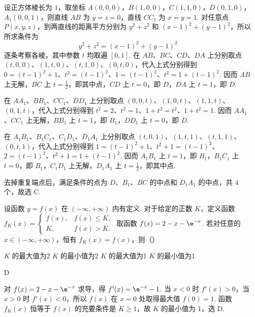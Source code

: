\begin{solution}
设正方体棱长为 \(1\)，取坐标 \(A(0,0,0)\)，\(B(1,0,0)\)，\(C(1,1,0)\)，\(D(0,1,0)\)，\(A_{1}(0,0,1)\)，则直线 \(AB\) 为 \(y=z=0\)，直线 \(CC_{1}\) 为 \(x=y=1\). 对任意点 \(P(x,y,z)\)，到两直线的距离平方分别为 \(y^{2}+z^{2}\) 和 \((x-1)^{2}+(y-1)^{2}\)，所以所求条件为
\[
y^2+z^2=(x-1)^2+(y-1)^2
\]
逐条考察各棱，其中参数 \(t\) 均取遍 \([0,1]\). 在 \(AB\)、\(BC\)、\(CD\)、\(DA\) 上分别取点 \((t,0,0)\)、\((1,t,0)\)、\((t,1,0)\)、\((0,t,0)\)，代入上式分别得到 \(0=(t-1)^2+1\)、\(t^2=(t-1)^2\)、\(1=(t-1)^2\)、\(t^2=1+(t-1)^2\). 因而 \(AB\) 上无解，\(BC\) 上 \(t=\frac12\)，即其中点，\(CD\) 上 \(t=0\)，即 \(D\)，\(DA\) 上 \(t=1\)，即 \(D\).

在 \(AA_{1}\)、\(BB_{1}\)、\(CC_{1}\)、\(DD_{1}\) 上分别取点 \((0,0,t)\)、\((1,0,t)\)、\((1,1,t)\)、\((0,1,t)\)，代入上式分别得到 \(t^2=2\)、\(t^2=1\)、\(1+t^2=t^2\)、\(1+t^2=1\). 因而 \(AA_{1}\)、\(CC_{1}\) 上无解，\(BB_{1}\) 上 \(t=1\)，即 \(B_{1}\)，\(DD_{1}\) 上 \(t=0\)，即 \(D\).

在 \(A_{1}B_{1}\)、\(B_{1}C_{1}\)、\(C_{1}D_{1}\)、\(D_{1}A_{1}\) 上分别取点 \((t,0,1)\)、\((1,t,1)\)、\((t,1,1)\)、\((0,t,1)\)，代入上式分别得到 \(1=(t-1)^2+1\)、\(t^2+1=(t-1)^2\)、\(2=(t-1)^2\)、\(t^2+1=1+(t-1)^2\). 因而 \(A_{1}B_{1}\) 上 \(t=1\)，即 \(B_{1}\)，\(B_{1}C_{1}\) 上 \(t=0\)，即 \(B_{1}\)，\(C_{1}D_{1}\) 上无解，\(D_{1}A_{1}\) 上 \(t=\frac12\)，即其中点.

去掉重复端点后，满足条件的点为 \(D\)、\(B_{1}\)、\(BC\) 的中点和 \(D_{1}A_{1}\) 的中点，共 \(4\) 个，故选 C.
\end{solution}

\begin{problem}
设函数 \( y = f(x) \) 在 \((- \infty, + \infty)\) 内有定义. 对于给定的正数 \(K\)，定义函数 \( f_{K}(x) = \begin{cases}
f(x), & f(x) \leqslant K,\\
K, & f(x) > K.
\end{cases} \) 取函数 \( f(x) = 2 - x - \e^{-x} \). 若对任意的 \( x \in (-\infty, +\infty)\)，恒有 \( f_{K}(x) = f(x) \)，则（\quad）

\choices
    {\(K\) 的最大值为2}
    {\(K\) 的最小值为2}
    {\(K\) 的最大值为1}
    {\(K\) 的最小值为1}
\end{problem}

\begin{answer}
D
\end{answer}

\begin{solution}
对 \(f(x)=2-x-\e^{-x}\) 求导，得 \(f'(x)=\e^{-x}-1\). 当 \(x<0\) 时 \(f'(x)>0\)，当 \(x>0\) 时 \(f'(x)<0\)，所以 \(f(x)\) 在 \(x=0\) 处取得最大值 \(f(0)=1\). 函数 \(f_K(x)\) 恒等于 \(f(x)\) 的充要条件是 \(K\geqslant1\)，故 \(K\) 的最小值为 \(1\)，选 D.
\end{solution}

